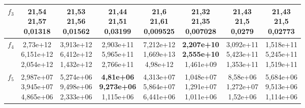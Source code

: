 \begin{table}[t]
\begin{small}
\begin{tabular}{|c|c|c|c|c|c|c|c|}
        $f_3$    & \makecell{21,54 \\ 21,57 \\ 0,01318}           & \makecell{21,53 \\ 21,56 \\ 0,01562}           & \makecell{21,44 \\ 21,51 \\ 0,03199}           & \makecell{21,6 \\ 21,61 \\ 0,009525}          & \makecell{\textbf{21,32} \\ \textbf{21,35} \\ 0,007028}          & \makecell{21,43 \\ 21,5 \\ 0,0279}             & \makecell{21,43 \\ 21,5 \\ 0,02773}            \\\hline
        $f_4$    & \makecell{2,73e+12 \\ 6,151e+12 \\ 2,054e+12}  & \makecell{3,913e+12 \\ 6,412e+12 \\ 1,432e+12} & \makecell{2,903e+11 \\ 5,965e+11 \\ 2,766e+11} & \makecell{7,212e+12 \\ 1,669e+13 \\ 4,98e+12}  & \makecell{\textbf{2,207e+10} \\ \textbf{2,555e+10} \\ 1,461e+09} & \makecell{3,092e+11 \\ 5,423e+11 \\ 1,353e+11} & \makecell{1,518e+11 \\ 5,245e+11 \\ 1,519e+11} \\\hline
        $f_5$    & \makecell{2,987e+07 \\ 3,945e+07 \\ 4,865e+06} & \makecell{5,274e+06 \\ 9,498e+06 \\ 2,333e+06} & \makecell{\textbf{4,81e+06} \\ \textbf{9,273e+06} \\ 1,115e+06}  & \makecell{4,313e+07 \\ 5,864e+07 \\ 6,441e+06} & \makecell{1,048e+07 \\ 1,291e+07 \\ 1,011e+06} & \makecell{8,58e+06 \\ 1,272e+07 \\ 1,52e+06}   & \makecell{5,684e+06 \\ 9,513e+06 \\ 1,114e+06} \\\hline

\end{tabular}
\end{small}
\end{table}
